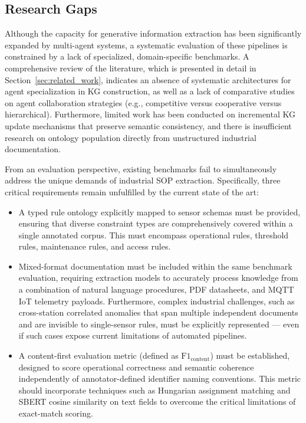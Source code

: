 ﻿\documentclass[11pt]{article}
\begin{document}
\subsection{Research Gaps}
Although the capacity for generative information extraction has been significantly expanded by multi-agent systems, a systematic evaluation of these pipelines is constrained by a lack of specialized, domain-specific benchmarks. A comprehensive review of the literature, which is presented in detail in Section~\ref{sec:related_work}, indicates an absence of systematic architectures for agent specialization in KG construction, as well as a lack of comparative studies on agent collaboration strategies (e.g., competitive versus cooperative versus hierarchical). Furthermore, limited work has been conducted on incremental KG update mechanisms that preserve semantic consistency, and there is insufficient research on ontology population directly from unstructured industrial documentation.

From an evaluation perspective, existing benchmarks fail to simultaneously address the unique demands of industrial SOP extraction. Specifically, three critical requirements remain unfulfilled by the current state of the art:
\begin{itemize}
    \item A typed rule ontology explicitly mapped to sensor schemas must be provided, ensuring that diverse constraint types are comprehensively covered within a single annotated corpus. This must encompass operational rules, threshold rules, maintenance rules, and access rules.
    \item Mixed-format documentation must be included within the same benchmark evaluation, requiring extraction models to accurately process knowledge from a combination of natural language procedures, PDF datasheets, and MQTT IoT telemetry payloads. Furthermore, complex industrial challenges, such as cross-station correlated anomalies that span multiple independent documents and are invisible to single-sensor rules, must be explicitly represented — even if such cases expose current limitations of automated pipelines.
    \item A content-first evaluation metric (defined as $\text{F1}_{\text{content}}$) must be established, designed to score operational correctness and semantic coherence independently of annotator-defined identifier naming conventions. This metric should incorporate techniques such as Hungarian assignment matching and SBERT cosine similarity on text fields to overcome the critical limitations of exact-match scoring.
\end{itemize}
\end{document}
